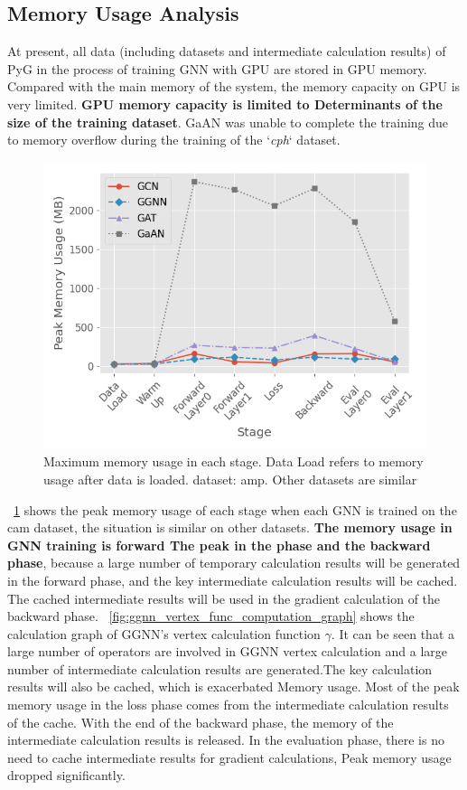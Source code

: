 \subsection{Memory Usage Analysis}

At present, all data (including datasets and intermediate calculation results) of PyG in the process of training GNN with GPU
are stored in GPU memory. Compared with the main memory of the system, the memory capacity on GPU is very limited.
\textbf{GPU memory capacity is limited to Determinants of the size of the training dataset}.
GaAN was unable to complete the training due to memory overflow during the training of the `\textit{cph}` dataset.

\begin{figure}
    \centering
    \includegraphics[width=0.7\columnwidth]{figs/experiments/exp_memory_usage_stage_amp.png}
    \caption{Maximum memory usage in each stage. Data Load refers to memory usage after data is loaded. dataset: amp. Other datasets are similar}
    \label{fig:exp_memory_usage_stage_amp}
\end{figure}

\figurename~\ref{fig:exp_memory_usage_stage_amp} shows the peak memory usage of each stage when each GNN is trained on the cam dataset, the situation is similar on other datasets.
\textbf{The memory usage in GNN training is forward The peak in the phase and the backward phase},
because a large number of temporary calculation results will be generated in the forward phase,
and the key intermediate calculation results will be cached.
The cached intermediate results will be used in the gradient calculation of the backward phase.
\figurename~\ref{fig:ggnn_vertex_func_computation_graph} shows the calculation graph of GGNN's vertex calculation function $\gamma$.
It can be seen that a large number of operators are involved in GGNN vertex calculation and a large number of intermediate calculation results are generated.The key calculation results will also be cached,
which is exacerbated Memory usage. Most of the peak memory usage in the loss phase comes from the intermediate calculation results of the cache.
With the end of the backward phase, the memory of the intermediate calculation results is released.
In the evaluation phase, there is no need to cache intermediate results for gradient calculations, Peak memory usage dropped significantly.

